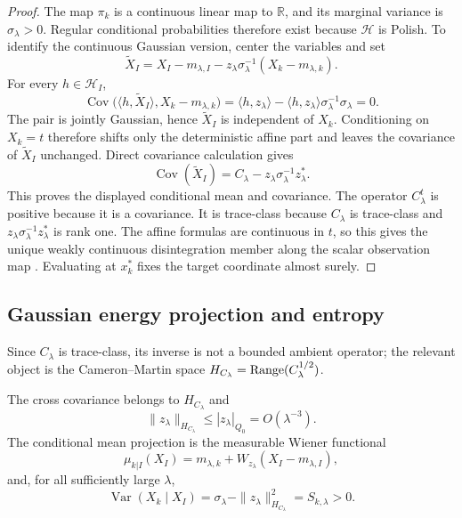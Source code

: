 \begin{proof}
The map $\pi_k$ is a continuous linear map to $\mathbb{R}$, and its marginal
variance is $\sigma_\lambda>0$.  Regular conditional probabilities therefore
exist because $\mathcal{H}$ is Polish.  To identify the continuous Gaussian
version, center the variables and set
\[
  \widetilde X_I
  =X_I-m_{\lambda,I}-z_\lambda\sigma_\lambda^{-1}(X_k-m_{\lambda,k}).
\]
For every $h\in\mathcal{H}_I$,
\[
  \operatorname{Cov}\bigl(\langle h,\widetilde X_I\rangle,
  X_k-m_{\lambda,k}\bigr)
  =\langle h,z_\lambda\rangle
   -\langle h,z_\lambda\rangle\sigma_\lambda^{-1}\sigma_\lambda
  =0.
\]
The pair is jointly Gaussian, hence $\widetilde X_I$ is independent of $X_k$.
Conditioning on $X_k=t$ therefore shifts only the deterministic affine part and
leaves the covariance of $\widetilde X_I$ unchanged.  Direct covariance
calculation gives
\[
  \operatorname{Cov}(\widetilde X_I)
  =C_\lambda-z_\lambda\sigma_\lambda^{-1}z_\lambda^*.
\]
This proves the displayed conditional mean and covariance.  The operator
$C_\lambda^t$ is positive because it is a covariance.  It is trace-class because
$C_\lambda$ is trace-class and $z_\lambda\sigma_\lambda^{-1}z_\lambda^*$ is
rank one.  The affine formulas are continuous in $t$, so this gives the unique
weakly continuous disintegration member along the scalar observation map
\cite{bogachev1998gaussian,lagatta2013continuous,steinwart2024conditioning,chen2024gaussian}.  Evaluating at $x_k^*$ fixes
the target coordinate almost surely.
\end{proof}

\subsection{Gaussian energy projection and entropy}

Since $C_\lambda$ is trace-class, its inverse is not a bounded ambient operator;
the relevant object is the Cameron--Martin space
$H_{C_\lambda}=\operatorname{Range}(C_\lambda^{1/2})$.

\begin{lemma}
\label{lem:conditional_predictor}
The cross covariance belongs to $H_{C_\lambda}$ and
\[
  \|z_\lambda\|_{H_{C_\lambda}}
  \le |z_\lambda|_{Q_0}=O(\lambda^{-3}).
\]
The conditional mean projection is the measurable Wiener functional
\[
  \mu_{k|I}(X_I)
  =
  m_{\lambda,k}
  +W_{z_\lambda}(X_I-m_{\lambda,I}),
\]
and, for all sufficiently large $\lambda$,
\[
  \operatorname{Var}(X_k\mid X_I)
  =
  \sigma_\lambda-\|z_\lambda\|_{H_{C_\lambda}}^2
  =S_{k,\lambda}>0.
\]
\end{lemma}

